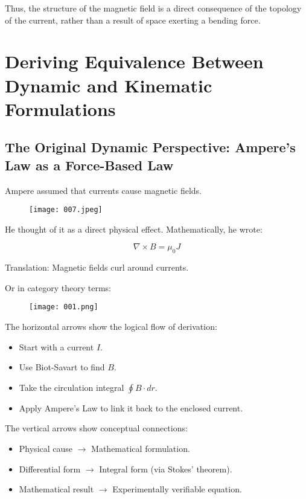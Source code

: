 \documentclass{article}
\begin{document}
Thus, the structure of the magnetic field is a direct consequence of the topology of the current, rather than a result of space exerting a bending force.

\clearpage
\section{Deriving Equivalence Between Dynamic and Kinematic Formulations}

\subsection{The Original Dynamic Perspective: Ampere’s Law as a Force-Based Law}

Ampere assumed that currents cause magnetic fields.

\begin{figure}[h]
    \centering
    \texttt{[image: 007.jpeg]} %
\end{figure}

He thought of it as a direct physical effect. Mathematically, he wrote:

\begin{equation}
    \nabla \times B = \mu_0 J
\end{equation}

Translation:  Magnetic fields curl around currents.

Or in category theory terms:

\begin{figure}[h]
    \centering
    \texttt{[image: 001.png]} %
\end{figure}

The horizontal arrows show the logical flow of derivation:
\begin{itemize}
    \item Start with a current \( I \).
    \item Use Biot-Savart to find \( B \).
    \item Take the circulation integral \( \oint B \cdot dr \).
    \item Apply Ampere’s Law to link it back to the enclosed current.
\end{itemize}

The vertical arrows show conceptual connections:
\begin{itemize}
    \item Physical cause \( \rightarrow \) Mathematical formulation.
    \item Differential form \( \rightarrow \) Integral form (via Stokes' theorem).
    \item Mathematical result \( \rightarrow \) Experimentally verifiable equation.
\end{itemize}
\end{document}
